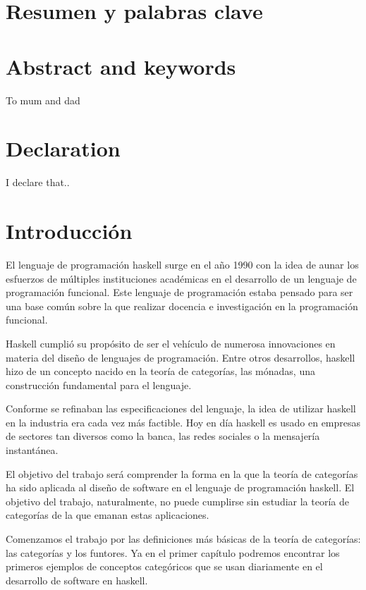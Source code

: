 \documentclass[12pt]{book}
\begin{document}
\tableofcontents

\chapter*{Resumen y palabras clave}


\chapter*{Abstract and keywords}
To mum and dad

\chapter*{Declaration}
I declare that..

\chapter*{Introducción}
El lenguaje de programación haskell surge en el año 1990 con
la idea de aunar los esfuerzos de múltiples instituciones académicas
en el desarrollo de un lenguaje de programación funcional. Este
lenguaje de programación estaba pensado para ser una base
común sobre la que realizar docencia e investigación en la
programación funcional.

Haskell cumplió su propósito de ser el vehículo de numerosa innovaciones
en materia del diseño de lenguajes de programación. Entre otros
desarrollos, haskell hizo de un concepto nacido en la teoría de
categorías, las mónadas, una construcción fundamental para el lenguaje.

Conforme se refinaban las especificaciones del lenguaje, la idea de
utilizar haskell en la industria era cada vez
más factible. Hoy en día haskell
es usado en empresas de sectores tan diversos como la banca,
las redes sociales o la mensajería instantánea.

El objetivo del trabajo será comprender la forma en la que
la teoría de categorías ha sido aplicada al diseño de software
en el lenguaje de programación haskell. El objetivo del trabajo,
naturalmente, no puede cumplirse sin estudiar la teoría de categorías
de la que emanan estas aplicaciones.

Comenzamos el trabajo por las definiciones más básicas de la
teoría de categorías: las categorías y los funtores. Ya en el
primer capítulo podremos encontrar los primeros ejemplos de
conceptos categóricos que se usan
diariamente en el desarrollo de software en haskell.
\end{document}
